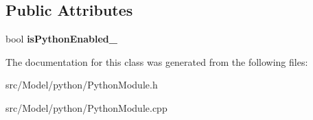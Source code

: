 \subsection*{Public Attributes}
\begin{DoxyCompactItemize}
\item 
bool {\bfseries is\+Python\+Enabled\+\_\+}\hypertarget{classPythonModule_a5ed3073a9b45efb58df3f3ecf40f04df}{}\label{classPythonModule_a5ed3073a9b45efb58df3f3ecf40f04df}

\end{DoxyCompactItemize}


The documentation for this class was generated from the following files\+:\begin{DoxyCompactItemize}
\item 
src/\+Model/python/Python\+Module.\+h\item 
src/\+Model/python/Python\+Module.\+cpp\end{DoxyCompactItemize}
